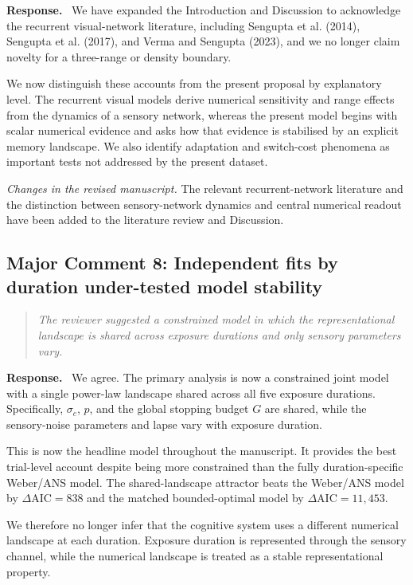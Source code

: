 \documentclass[11pt]{article}
\newenvironment{reviewercomment}{\begin{quote}\color{reviewgray}\itshape}{\end{quote}}
\newenvironment{authorresponse}{\par\noindent\textbf{\color{responseblue}Response.}\ }{\par}
\newcommand{\change}[1]{\par\noindent\textit{Changes in the revised manuscript.} #1\par}
\begin{document}
\begin{authorresponse}
We have expanded the Introduction and Discussion to acknowledge the recurrent visual-network literature, including Sengupta et al. (2014), Sengupta et al. (2017), and Verma and Sengupta (2023), and we no longer claim novelty for a three-range or density boundary.

We now distinguish these accounts from the present proposal by explanatory level. The recurrent visual models derive numerical sensitivity and range effects from the dynamics of a sensory network, whereas the present model begins with scalar numerical evidence and asks how that evidence is stabilised by an explicit memory landscape. We also identify adaptation and switch-cost phenomena as important tests not addressed by the present dataset.
\end{authorresponse}

\change{The relevant recurrent-network literature and the distinction between sensory-network dynamics and central numerical readout have been added to the literature review and Discussion.}

\subsection*{Major Comment 8: Independent fits by duration under-tested model stability}

\begin{reviewercomment}
The reviewer suggested a constrained model in which the representational landscape is shared across exposure durations and only sensory parameters vary.
\end{reviewercomment}

\begin{authorresponse}
We agree. The primary analysis is now a constrained joint model with a single power-law landscape shared across all five exposure durations. Specifically, $\sigma_c$, $p$, and the global stopping budget $G$ are shared, while the sensory-noise parameters and lapse vary with exposure duration.

This is now the headline model throughout the manuscript. It provides the best trial-level account despite being more constrained than the fully duration-specific Weber/ANS model. The shared-landscape attractor beats the Weber/ANS model by $\Delta\mathrm{AIC}=838$ and the matched bounded-optimal model by $\Delta\mathrm{AIC}=11{,}453$.

We therefore no longer infer that the cognitive system uses a different numerical landscape at each duration. Exposure duration is represented through the sensory channel, while the numerical landscape is treated as a stable representational property.
\end{authorresponse}
\end{document}
